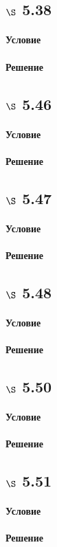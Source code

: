 \documentclass[a4paper,12pt]{article}
\begin{document}
\subsection*{$\S$ 5.38}
\paragraph*{Условие}
\paragraph*{Решение}

\subsection*{$\S$ 5.46}
\paragraph*{Условие}
\paragraph*{Решение}

\subsection*{$\S$ 5.47}
\paragraph*{Условие}
\paragraph*{Решение}

\subsection*{$\S$ 5.48}
\paragraph*{Условие}
\paragraph*{Решение}

\subsection*{$\S$ 5.50}
\paragraph*{Условие}
\paragraph*{Решение}

\subsection*{$\S$ 5.51}
\paragraph*{Условие}
\paragraph*{Решение}
\end{document}
